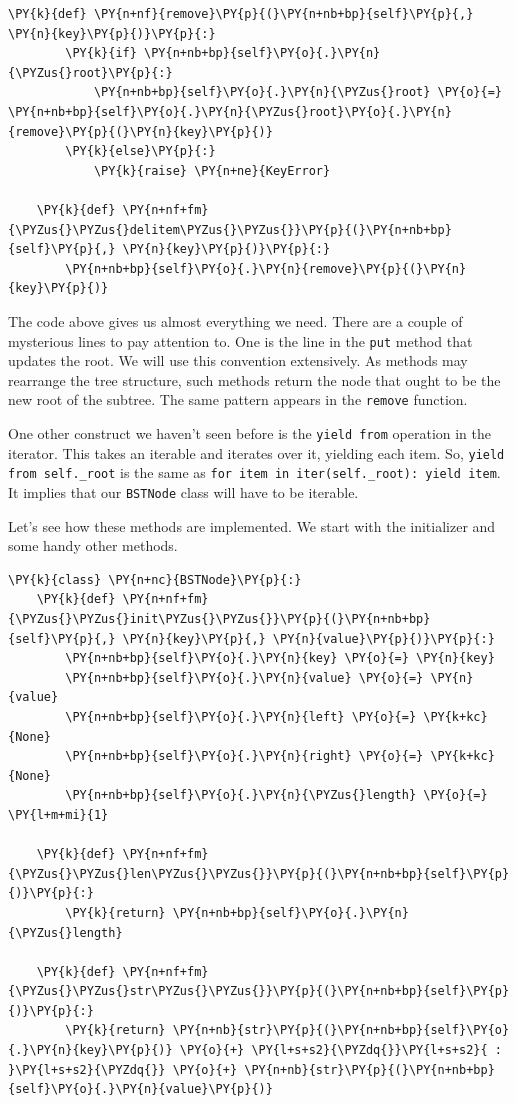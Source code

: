 \begin{Verbatim}[commandchars=\\\{\}]
    \PY{k}{def} \PY{n+nf}{remove}\PY{p}{(}\PY{n+nb+bp}{self}\PY{p}{,} \PY{n}{key}\PY{p}{)}\PY{p}{:}
        \PY{k}{if} \PY{n+nb+bp}{self}\PY{o}{.}\PY{n}{\PYZus{}root}\PY{p}{:}
            \PY{n+nb+bp}{self}\PY{o}{.}\PY{n}{\PYZus{}root} \PY{o}{=} \PY{n+nb+bp}{self}\PY{o}{.}\PY{n}{\PYZus{}root}\PY{o}{.}\PY{n}{remove}\PY{p}{(}\PY{n}{key}\PY{p}{)}
        \PY{k}{else}\PY{p}{:}
            \PY{k}{raise} \PY{n+ne}{KeyError}

    \PY{k}{def} \PY{n+nf+fm}{\PYZus{}\PYZus{}delitem\PYZus{}\PYZus{}}\PY{p}{(}\PY{n+nb+bp}{self}\PY{p}{,} \PY{n}{key}\PY{p}{)}\PY{p}{:}
        \PY{n+nb+bp}{self}\PY{o}{.}\PY{n}{remove}\PY{p}{(}\PY{n}{key}\PY{p}{)}
\end{Verbatim}



The code above gives us almost everything we need.  There are a couple of mysterious lines to pay attention to.  One is the line in the \texttt{put} method that updates the root.  We will use this convention extensively.  As methods may rearrange the tree structure, such methods return the node that ought to be the new root of the subtree.  The same pattern appears in the \texttt{remove} function.


One other construct we haven't seen before is the \texttt{yield from} operation in the iterator.  This takes an iterable and iterates over it, yielding each item.  So, \texttt{yield from self.\_root} is the same as \texttt{for item in iter(self.\_root): yield item}.  It implies that our \texttt{BSTNode} class will have to be iterable.


Let's see how these methods are implemented.  We start with the initializer and some handy other methods.

\begin{Verbatim}[commandchars=\\\{\}]
\PY{k}{class} \PY{n+nc}{BSTNode}\PY{p}{:}
    \PY{k}{def} \PY{n+nf+fm}{\PYZus{}\PYZus{}init\PYZus{}\PYZus{}}\PY{p}{(}\PY{n+nb+bp}{self}\PY{p}{,} \PY{n}{key}\PY{p}{,} \PY{n}{value}\PY{p}{)}\PY{p}{:}
        \PY{n+nb+bp}{self}\PY{o}{.}\PY{n}{key} \PY{o}{=} \PY{n}{key}
        \PY{n+nb+bp}{self}\PY{o}{.}\PY{n}{value} \PY{o}{=} \PY{n}{value}
        \PY{n+nb+bp}{self}\PY{o}{.}\PY{n}{left} \PY{o}{=} \PY{k+kc}{None}
        \PY{n+nb+bp}{self}\PY{o}{.}\PY{n}{right} \PY{o}{=} \PY{k+kc}{None}
        \PY{n+nb+bp}{self}\PY{o}{.}\PY{n}{\PYZus{}length} \PY{o}{=} \PY{l+m+mi}{1}

    \PY{k}{def} \PY{n+nf+fm}{\PYZus{}\PYZus{}len\PYZus{}\PYZus{}}\PY{p}{(}\PY{n+nb+bp}{self}\PY{p}{)}\PY{p}{:}
        \PY{k}{return} \PY{n+nb+bp}{self}\PY{o}{.}\PY{n}{\PYZus{}length}

    \PY{k}{def} \PY{n+nf+fm}{\PYZus{}\PYZus{}str\PYZus{}\PYZus{}}\PY{p}{(}\PY{n+nb+bp}{self}\PY{p}{)}\PY{p}{:}
        \PY{k}{return} \PY{n+nb}{str}\PY{p}{(}\PY{n+nb+bp}{self}\PY{o}{.}\PY{n}{key}\PY{p}{)} \PY{o}{+} \PY{l+s+s2}{\PYZdq{}}\PY{l+s+s2}{ : }\PY{l+s+s2}{\PYZdq{}} \PY{o}{+} \PY{n+nb}{str}\PY{p}{(}\PY{n+nb+bp}{self}\PY{o}{.}\PY{n}{value}\PY{p}{)}
\end{Verbatim}



